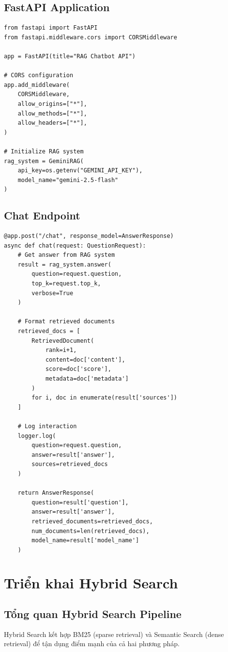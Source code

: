 \documentclass[../DoAn.tex]{subfiles}
\begin{document}
\subsection{FastAPI Application}
\begin{verbatim}
from fastapi import FastAPI
from fastapi.middleware.cors import CORSMiddleware

app = FastAPI(title="RAG Chatbot API")

# CORS configuration
app.add_middleware(
    CORSMiddleware,
    allow_origins=["*"],
    allow_methods=["*"],
    allow_headers=["*"],
)

# Initialize RAG system
rag_system = GeminiRAG(
    api_key=os.getenv("GEMINI_API_KEY"),
    model_name="gemini-2.5-flash"
)
\end{verbatim}

\subsection{Chat Endpoint}
\begin{verbatim}
@app.post("/chat", response_model=AnswerResponse)
async def chat(request: QuestionRequest):
    # Get answer from RAG system
    result = rag_system.answer(
        question=request.question,
        top_k=request.top_k,
        verbose=True
    )
    
    # Format retrieved documents
    retrieved_docs = [
        RetrievedDocument(
            rank=i+1,
            content=doc['content'],
            score=doc['score'],
            metadata=doc['metadata']
        )
        for i, doc in enumerate(result['sources'])
    ]
    
    # Log interaction
    logger.log(
        question=request.question,
        answer=result['answer'],
        sources=retrieved_docs
    )
    
    return AnswerResponse(
        question=result['question'],
        answer=result['answer'],
        retrieved_documents=retrieved_docs,
        num_documents=len(retrieved_docs),
        model_name=result['model_name']
    )
\end{verbatim}

\section{Triển khai Hybrid Search}

\subsection{Tổng quan Hybrid Search Pipeline}
Hybrid Search kết hợp BM25 (sparse retrieval) và Semantic Search (dense retrieval) để tận dụng điểm mạnh của cả hai phương pháp.
\end{document}
